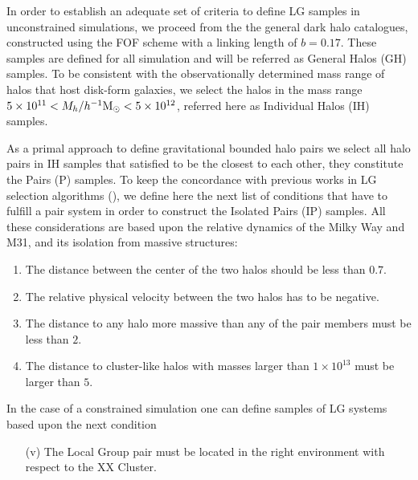 \documentclass[usenatbib]{latex/mn2e}
\begin{document}
In order to establish an adequate set of criteria to define LG samples in 
unconstrained simulations, we proceed from the the general dark halo 
catalogues, constructed using the FOF scheme with a linking length of 
$b=0.17$. These samples are defined for all simulation and will be 
referred as General Halos (GH) samples. To be consistent with the 
observationally determined mass range of halos that host disk-form 
galaxies, we select the halos in the mass range $5\times10^{11} <
M_{h}/\hMsun < 5\times 10^{12}$, referred here as Individual Halos (IH) 
samples. 


As a primal approach to define gravitational bounded halo pairs we select 
all halo pairs in IH samples that satisfied to be the closest to each 
other, they constitute the Pairs (P) samples. To keep the concordance with
previous works in LG selection algorithms (\SRKED{[references here}), we 
define here the next list of conditions that have to fulfill a pair system 
in order to construct the Isolated Pairs (IP) samples. All these 
considerations are based upon the relative dynamics of the Milky Way and 
M31, and its isolation from massive structures:


\begin{enumerate}

\item{The distance between the center of the two halos should be less than 
$0.7$\hMpc.}

\item{The relative physical velocity between the two halos has to be 
negative.}

\item{The distance to any halo more massive than any of the pair members 
must be less than $2$\hMpc.}

\item{The distance to cluster-like halos with masses larger than $1\times10^{13}$
\hMsun must be larger than $5$\hMpc.}
\end{enumerate}


In the case of a constrained simulation one can define samples of LG 
systems based upon the next condition


\begin{enumerate}
\item[(v)]{The Local Group pair must be located in the right environment 
with respect to the XX Cluster.}
\end{enumerate}
\end{document}
